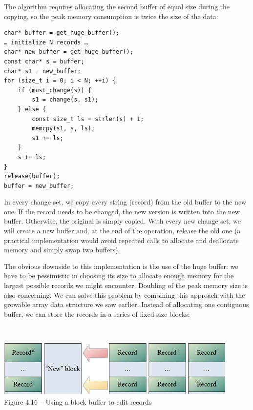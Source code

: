 The algorithm requires allocating the second buffer of equal size during the copying, so the peak memory consumption is twice the size of the data:

\begin{lstlisting}[style=styleCXX]
char* buffer = get_huge_buffer();
… initialize N records …
char* new_buffer = get_huge_buffer();
const char* s = buffer;
char* s1 = new_buffer;
for (size_t i = 0; i < N; ++i) {
	if (must_change(s)) {
		s1 = change(s, s1);
	} else {
		const size_t ls = strlen(s) + 1;
		memcpy(s1, s, ls);
		s1 += ls;
	}
	s += ls;
}
release(buffer);
buffer = new_buffer;
\end{lstlisting}

In every change set, we copy every string (record) from the old buffer to the new one. If the record needs to be changed, the new version is written into the new buffer. Otherwise, the original is simply copied. With every new change set, we will create a new buffer and, at the end of the operation, release the old one (a practical implementation would avoid repeated calls to allocate and deallocate memory and simply swap two buffers).

The obvious downside to this implementation is the use of the huge buffer: we have to be pessimistic in choosing its size to allocate enough memory for the largest possible records we might encounter. Doubling of the peak memory size is also concerning. We can solve this problem by combining this approach with the growable array data structure we saw earlier. Instead of allocating one contiguous buffer, we can store the records in a series of fixed-size blocks:

\hspace*{\fill} \\ %
\begin{center}
\includegraphics[width=0.9\textwidth]{content/1/chapter4/images/16.jpg}\\
Figure 4.16 – Using a block buffer to edit records
\end{center}

